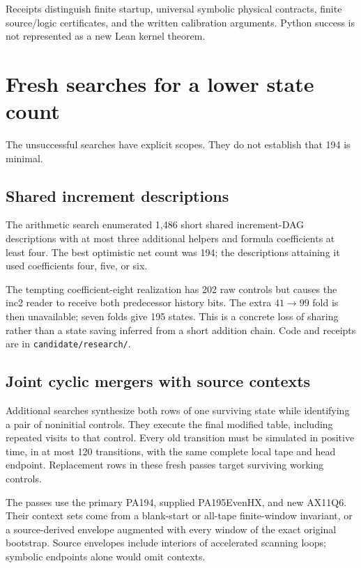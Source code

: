 \documentclass[10pt,letterpaper]{article}
\newcommand{\file}[1]{\texttt{\nolinkurl{#1}}}
\begin{document}
Receipts distinguish finite startup, universal symbolic physical
contracts, finite source/logic certificates, and the written calibration
arguments. Python success is not represented as a new Lean kernel theorem.

\section{Fresh searches for a lower state count}
\label{sec:search}

The unsuccessful searches have explicit scopes. They do not establish
that 194 is minimal.

\subsection{Shared increment descriptions}

The arithmetic search enumerated 1,486 short shared increment-DAG
descriptions with at most three additional helpers and formula
coefficients at least four. The best optimistic net count was 194;
the descriptions attaining it used coefficients four, five, or six.

The tempting coefficient-eight realization has 202 raw controls but
causes the inc2 reader to receive both predecessor history bits.
The extra $41\to99$ fold is then unavailable; seven folds give
195 states. This is a concrete loss of sharing rather than a
state saving inferred from a short addition chain.
Code and receipts are in \file{candidate/research/}.

\subsection{Joint cyclic mergers with source contexts}

Additional searches synthesize both rows of one surviving state while
identifying a pair of noninitial controls. They execute the final modified table,
including repeated visits to that control. Every old transition must
be simulated in positive time, in at most 120 transitions, with the
same complete local tape and head endpoint. Replacement rows in these
fresh passes target surviving working controls.

The passes use the primary PA194, supplied PA195EvenHX, and new AX11Q6.
Their context sets come from a blank-start or all-tape finite-window
invariant, or a source-derived envelope augmented with every window of
the exact original bootstrap. Source envelopes include interiors of
accelerated scanning loops; symbolic endpoints alone would omit contexts.
\end{document}
